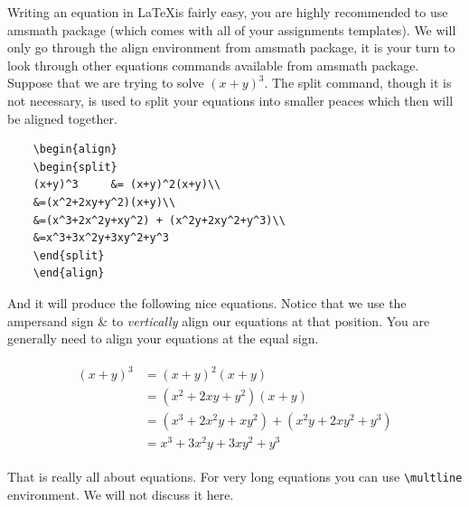 \documentclass[paper=a4, fontsize=11pt]{scrartcl} %
\numberwithin{equation}{section} %
\numberwithin{figure}{section} %
\numberwithin{table}{section} %
\begin{document}
Writing an equation in \LaTeX is fairly easy, you are highly recommended to use amsmath package (which comes with all of your assignments templates). We will only go through the align environment from amsmath package, it is your turn to look through other equations commands available from amsmath package. Suppose that we are trying to solve \(\left(x+y\right)^3\). The split command, though it is not necessary, is used to split your equations into smaller peaces which then will be aligned together. 

\begin{verbatim}
	\begin{align} 
	\begin{split}
	(x+y)^3 	&= (x+y)^2(x+y)\\
	&=(x^2+2xy+y^2)(x+y)\\
	&=(x^3+2x^2y+xy^2) + (x^2y+2xy^2+y^3)\\
	&=x^3+3x^2y+3xy^2+y^3
	\end{split}					
	\end{align}
\end{verbatim}

And it will produce the following nice equations. Notice that we use the ampersand sign \& to \textit{vertically} align our equations at that position. You are generally need to align your equations at the equal sign.

\begin{align} 
\begin{split}
(x+y)^3 	&= (x+y)^2(x+y)\\
&=(x^2+2xy+y^2)(x+y)\\
&=(x^3+2x^2y+xy^2) + (x^2y+2xy^2+y^3)\\
&=x^3+3x^2y+3xy^2+y^3
\end{split}					
\end{align}

That is really all about equations. For very long equations you can use \verb|\multline| environment. We will not discuss it here.
\end{document}
